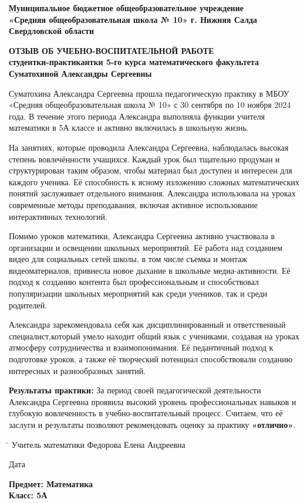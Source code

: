 \documentclass[a4paper,12pt]{article}
\begin{document}
\begin{center}
    \textbf{Муниципальное бюджетное общеобразовательное учреждение}\\
    \textbf{«Средняя общеобразовательная школа № 10» г. Нижняя Салда Свердловской области}\\
    \end{center}
\begin{center}
    \textbf{\large ОТЗЫВ ОБ УЧЕБНО-ВОСПИТАТЕЛЬНОЙ РАБОТЕ}\\
    \textbf{студентки-практикантки 5-го курса математического факультета}\\
    \textbf{Суматохиной Александры Сергеевны}
    \end{center}
\vspace{10mm}

Суматохина Александра Сергеевна прошла педагогическую практику в МБОУ «Средняя общеобразовательная школа № 10» с 30 сентября по 10 ноября 2024 года. В течение этого периода Александра выполняла функции учителя математики в 5А классе и активно включилась в школьную жизнь.

На занятиях, которые проводила Александра Сергеевна, наблюдалась высокая степень вовлечённости учащихся. Каждый урок был тщательно продуман и структурирован таким образом, чтобы материал был доступен и интересен для каждого ученика. Её способность к ясному изложению сложных математических понятий заслуживает отдельного внимания. Александра использовала на уроках современные методы преподавания, включая активное использование интерактивных технологий.

Помимо уроков математики, Александра Сергеевна активно участвовала в организации и освещении школьных мероприятий. Её работа над созданием видео для социальных сетей школы, в том числе съемка и монтаж видеоматериалов, привнесла новое дыхание в школьные медиа-активности. Её подход к созданию контента был профессиональным и способствовал популяризации школьных мероприятий как среди учеников, так и среди родителей.

Александра зарекомендовала себя как дисциплинированный и ответственный специалист,который умело находит общий язык с учениками, создавая на уроках атмосферу сотрудничества и взаимопонимания. Её педантичный подход к подготовке уроков, а также её творческий потенциал способствовали созданию интересных и разнообразных занятий.

\vspace{5mm}

\textbf{Результаты практики:} За период своей педагогической деятельности Александра Сергеевна проявила высокий уровень профессиональных навыков и глубокую вовлеченность в учебно-воспитательный процесс. Считаем, что её заслуги и результаты позволяют рекомендовать оценку за практику \textbf{«отлично»}.

\vspace{10mm}

\noindent
\begin{tabbing}
\hspace{4cm} \= \kill
Учитель математики \> \underline{\hspace{5cm}} Федорова Елена Андреевна
\end{tabbing}
Дата \underline{\hspace{5cm}}

\vspace{5mm}

\noindent
\textbf{Предмет: Математика}\\
\textbf{Класс: 5А}\\
\end{document}
